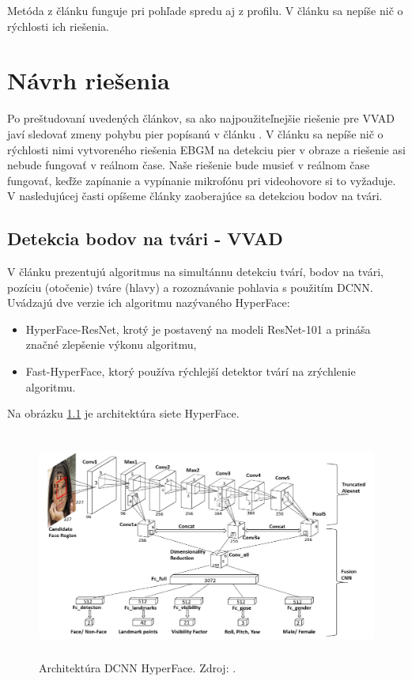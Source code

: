Metóda z článku \cite{joosten2015voice} funguje pri pohľade spredu aj z profilu.
V článku sa nepíše nič o rýchlosti ich riešenia.\\

\chapter{Návrh riešenia}
Po preštudovaní uvedených článkov, sa ako najpoužiteľnejšie riešenie pre VVAD javí sledovať zmeny pohybu pier popísanú v článku \cite{aoki2007voice}. 
V článku sa nepíše nič o rýchlosti nimi vytvoreného riešenia EBGM na detekciu pier v obraze a riešenie asi nebude fungovať v reálnom čase. 
Naše riešenie bude musieť v reálnom čase fungovať, keďže zapínanie a vypínanie mikrofónu pri videohovore si to vyžaduje. 
V nasledujúcej časti opíšeme články zaoberajúce sa detekciou bodov na tvári.\\

\section{Detekcia bodov na tvári - VVAD}

V článku \cite{ranjan2017hyperface} prezentujú algoritmus na simultánnu detekciu tvárí, bodov na tvári, pozíciu (otočenie) tváre (hlavy) a rozoznávanie pohlavia s použitím DCNN. 
Uvádzajú dve verzie ich algoritmu nazývaného HyperFace:
 \begin{itemize}
\item HyperFace-ResNet, krotý je postavený na modeli ResNet-101 a prináša značné zlepšenie výkonu algoritmu,
\item Fast-HyperFace, ktorý používa rýchlejší detektor tvárí na zrýchlenie algoritmu.
\end{itemize}
Na obrázku \ref{pic-ranjan2017hyperface-siet} je architektúra siete HyperFace. 

\begin{figure}[H]
	\begin{center}
		\includegraphics[height=7.5cm]{pics/pic-ranjan2017hyperface-siet.png}
		\caption{Architektúra DCNN HyperFace. 
		Zdroj: \cite{ranjan2017hyperface}.}
		\label{pic-ranjan2017hyperface-siet}
	\end{center}
\end{figure}

